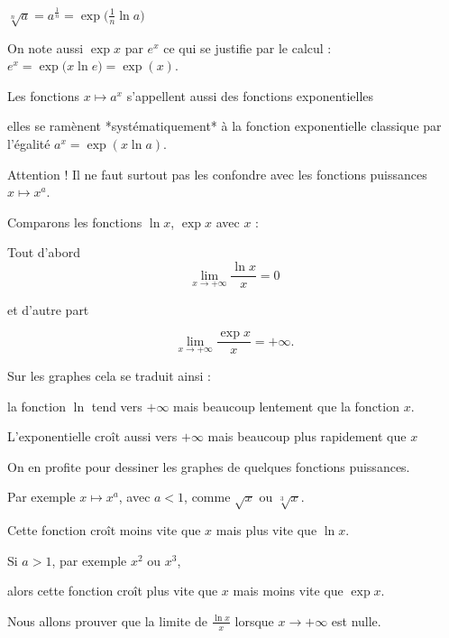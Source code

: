 $\sqrt[n] a = a^\frac1n = \exp\big( \frac1n \ln a\big)$

\change

On note aussi $\exp x$ par $e^x$ ce qui se justifie par le calcul : 
$e^x =  \exp\big(x \ln e \big) = \exp(x)$.


\change

Les fonctions $x \mapsto a^x$ s'appellent aussi des fonctions exponentielles 

\change

elles se ramènent *systématiquement* à la fonction exponentielle classique 
par l'égalité $a^x = \exp(x \ln a)$. 


\change

Attention ! Il ne faut surtout pas les confondre avec les fonctions puissances 
$x \mapsto x^a$.


\diapo

Comparons les fonctions $\ln x$, $\exp x$ avec $x$ :

Tout d'abord 
$$\lim_{x\to +\infty} \frac{\ln x}{x} = 0$$


\change

et d'autre part 

$$\lim_{x\to +\infty} \frac{\exp x}{x} = +\infty.$$

\change


Sur les graphes cela se traduit ainsi :

la fonction $\ln$ tend vers $+ \infty$ mais beaucoup lentement
que la fonction $x$.

L'exponentielle croît aussi vers $+\infty$ mais beaucoup plus rapidement que $x$

On en profite pour dessiner les graphes de quelques fonctions puissances.

Par exemple $x \mapsto x^a$, avec $a <1$, comme $\sqrt x$ ou $\sqrt[3]x$.

Cette fonction croît moins vite que $x$ mais plus vite que $\ln x$.


Si $a > 1$, par exemple $x^2$ ou $x^3$,

alors cette fonction croît plus vite que $x$ mais moins vite que $\exp x$.



\diapo

Nous allons prouver que la limite de $\frac{\ln x}{x}$
lorsque $x\to +\infty$ est nulle.

\change

